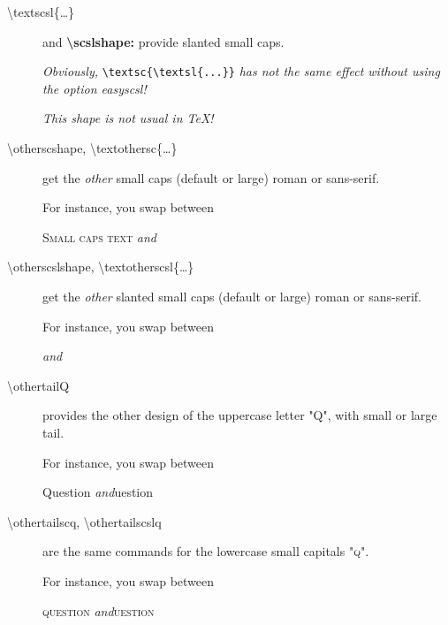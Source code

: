 \documentclass[a4paper,11pt]{christophe}
\begin{document}
\begin{description}
  \item[\textbackslash textscsl\{\dots\}] and \textbf{\textbackslash scslshape:} 
        provide slanted small caps.
        
        \begin{center}
        \end{center}
  
  \begin{center}
  \textit{Obviously, }\verb=\textsc{\textsl{...}}=\textit{ has not the same effect without using the option \textup{easyscsl}!}
  
  \textit{This shape is not usual in \TeX!}
  \end{center}
  \item[\textbackslash otherscshape, \textbackslash textothersc\{\dots\}]
        get the \textit{other} small caps (default or large) roman or sans-serif.
        
        \begin{center}
        For instance, you swap between
        
        \textsc{Small caps text} \quad\textit{and}\quad {}
        \end{center}
  \item[\textbackslash otherscslshape, \textbackslash textotherscsl\{\dots\}]
        get the \textit{other} slanted small caps (default or large) roman or sans-serif.
        
        \begin{center}
        For instance, you swap between
        
         \quad\textit{and}\quad {}
        \end{center}
  \item[\textbackslash othertailQ]
        provides the other design of the uppercase letter "Q",
        with small or large tail.
        
        \begin{center}
        For instance, you swap between
        
        Question \quad\textit{and}\quad \othertailQ uestion
        \end{center}
  \item[\textbackslash othertailscq, \textbackslash othertailscslq] 
        are the same commands for the lowercase small capitals "\textsc{q}".
        
        \begin{center}
        For instance, you swap between
        
        \textsc{question} \quad\textit{and}\quad \textsc{\othertailscq uestion}
        \end{center}
\end{description}
\end{document}
